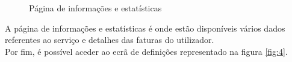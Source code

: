 \vspace{8.5cm}

\begin{figure}[ht!]
\centering
{}
\caption{Página de informações e estatísticas}
\label{fig:3}
\end{figure}

A página de informações e estatísticas é onde estão disponíveis vários dados referentes ao serviço e detalhes das faturas do utilizador.\\ Por fim, é possível aceder ao ecrã de definições representado na figura \ref{fig:4}.

\vspace{20cm}

